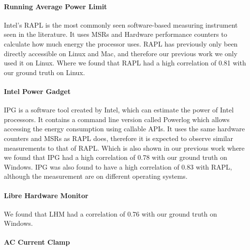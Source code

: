 \paragraph{Running Average Power Limit}
Intel's RAPL is the most commonly seen software-based measuring instrument seen in the literature. It uses MSRs and Hardware performance counters to calculate how much energy the processor uses. RAPL has previously only been directly accessible on Linux and Mac, and therefore our previous work we only used it on Linux. Where we found that RAPL had a high correlation of 0.81 with our ground truth on Linux.\cite{biksbois}

\paragraph{Intel Power Gadget}
IPG is a software tool created by Intel, which can estimate the power of Intel processors. It contains a command line version called Powerlog which allows accessing the energy consumption using callable APIs. It uses the same hardware counters and MSRs as RAPL does, therefore it is expected to observe similar measurements to that of RAPL. Which is also shown in our previous work where we found that IPG had a high correlation of 0.78 with our ground truth on Windows. IPG was also found to have a high correlation of 0.83 with RAPL, although the measurement are on different operating systems.\cite{biksbois}





\paragraph{Libre Hardware Monitor}

We found that LHM had a correlation of 0.76 with our ground truth on Windows.\cite{biksbois}

\paragraph{AC Current Clamp}

